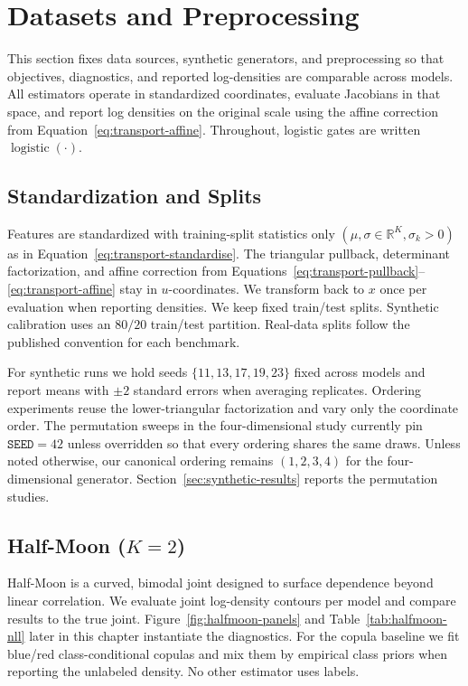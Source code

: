 \documentclass[11pt,a4paper,twoside]{book}\usepackage[]{graphicx}\usepackage[]{xcolor}
\begin{document}
\section{Datasets and Preprocessing}\label{sec:datasets-preprocessing}

This section fixes data sources, synthetic generators, and preprocessing so that objectives, diagnostics, and reported log-densities are comparable across models. All estimators operate in standardized coordinates, evaluate Jacobians in that space, and report log densities on the original scale using the affine correction from Equation~\eqref{eq:transport-affine}. Throughout, logistic gates are written $\operatorname{logistic}(\cdot)$.

\subsection{Standardization and Splits}
Features are standardized with training-split statistics only $(\mu, \sigma \in \mathbb{R}^K, \sigma_k > 0)$ as in Equation~\eqref{eq:transport-standardise}. The triangular pullback, determinant factorization, and affine correction from Equations~\eqref{eq:transport-pullback}--\eqref{eq:transport-affine} stay in $u$-coordinates. We transform back to $x$ once per evaluation when reporting densities. We keep fixed train/test splits. Synthetic calibration uses an $80/20$ train/test partition. Real-data splits follow the published convention for each benchmark.

For synthetic runs we hold seeds $\{11, 13, 17, 19, 23\}$ fixed across models and report means with $\pm 2$ standard errors when averaging replicates. Ordering experiments reuse the lower-triangular factorization and vary only the coordinate order. The permutation sweeps in the four-dimensional study currently pin $\texttt{SEED}=42$ unless overridden so that every ordering shares the same draws. Unless noted otherwise, our canonical ordering remains $(1,2,3,4)$ for the four-dimensional generator. Section~\ref{sec:synthetic-results} reports the permutation studies.

\subsection{Half-Moon ($K=2$)}
Half-Moon is a curved, bimodal joint designed to surface dependence beyond linear correlation. We evaluate joint log-density contours per model and compare results to the true joint. Figure~\ref{fig:halfmoon-panels} and Table~\ref{tab:halfmoon-nll} later in this chapter instantiate the diagnostics. For the copula baseline we fit blue/red class-conditional copulas and mix them by empirical class priors when reporting the unlabeled density. No other estimator uses labels.
\end{document}
